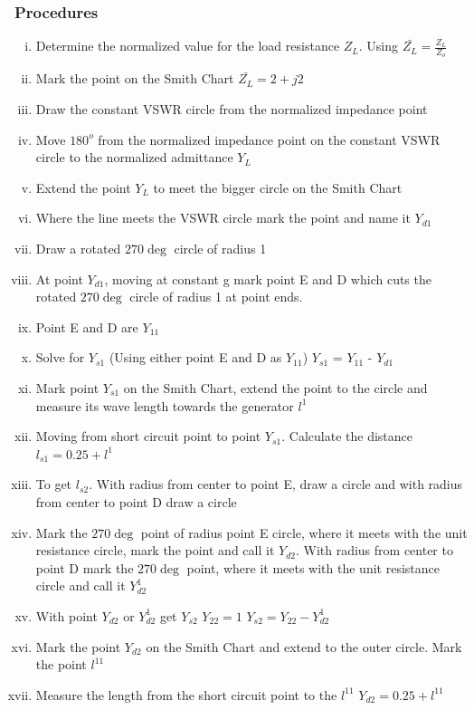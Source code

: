 \begin{exmp}
\subsubsection*{Procedures}
\begin{enumerate}[(i)]
\item Determine the normalized value for the load resistance $Z_{L}$. Using $\bar{Z_{L}} = \frac{Z_{L}}{Z_{o}}$ 
\item Mark the point on the Smith Chart $\bar{Z_{L}} = 2 + j2$  
\item Draw the constant VSWR circle from the normalized impedance point
\item Move $180^{o}$ from the normalized impedance point on the constant VSWR circle to the normalized admittance $Y_{L}$
\item Extend the point $Y_{L}$ to meet the bigger circle on the Smith Chart 
\item Where the line meets the VSWR circle mark the point and name it $Y_{d1}$            
\item Draw a rotated $270\deg $ circle of radius 1                         
\item At point $Y_{d1}$, moving at constant g mark point E and D which cuts the rotated $270\deg $ circle of radius 1 at point ends.
\item Point E and D are $Y_{11}$                        
\item Solve for $Y_{s1}$ (Using either point E and D as $Y_{11}$) $Y_{s1}$ =  $Y_{11}$ -  $Y_{d1}$           
\item Mark point $Y_{s1}$ on the Smith Chart, extend the point to the circle and measure its wave length towards the generator $l^{1}$ 
\item Moving from short circuit point to point $Y_{s1}$. Calculate the distance
$ l_{s1} = 0.25 + l^{1} $                                    
\item To get $l_{s2}$. With radius from center to point E, draw a circle and with radius from center to point D draw a circle
\item Mark the $270\deg$ point of radius point E circle, where it meets with the unit resistance circle, mark the point and call it $Y_{d2}$. With radius from center to point D mark the $270\deg$ point, where it meets with the unit resistance circle and call it $Y_{d2}^{1}$ 
\item With point $Y_{d2}$ or $Y_{d2}^{1}$ get $Y_{s2}$ $Y_{22}=1$ $Y_{s2}=Y_{22}-Y_{d2}^{1}$
\item Mark the point $Y_{d2}$ on the Smith Chart and extend to the outer circle. Mark the point $l^{11}$
\item Measure the length from the short circuit point to the $l^{11}$ $Y_{d2} = 0.25 + l^{11}$
\end{enumerate}
\end{exmp}

